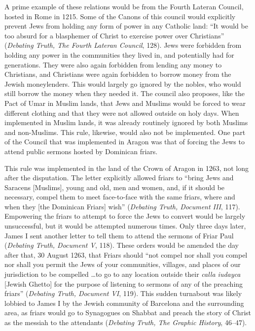 \documentclass[12pt]{article}
\begin{document}
A prime example of these relations would be from the Fourth Lateran Council, hosted in Rome in 1215.
Some of the Canons of this council would explicitly prevent Jews from holding any form of power in any Catholic land:
``It would be too absurd for a blasphemer of Christ to exercise power over Christians'' (\emph{Debating Truth, The Fourth Lateran Council}, 128).
Jews were forbidden from holding any power in the communities they lived in, and potentially had for generations.
They were also again forbidden from lending any money to Christians, and Christians were again forbidden to borrow money from the Jewish moneylenders.
This would largely go ignored by the nobles, who would still borrow the money when they needed it.
The council also proposes, like the Pact of Umar in Muslim lands, that Jews and Muslims would be forced to wear different clothing and that they were not allowed outside on holy days.
When implemented in Muslim lands, it was already routinely ignored by both Muslims and non-Muslims.
This rule, likewise, would also not be implemented.
One part of the Council that was implemented in Aragon was that of forcing the Jews to attend public sermons hosted by Dominican friars.

This rule was implemented in the land of the Crown of Aragon in 1263, not long after the disputation.
The letter explicitly allowed friars to
``bring Jews and Saracens [Muslims], young and old, men and women, and, if it should be necessary, compel them to meet face-to-face with the same friars, where and when they [the Dominican Friars]  wish'' (\emph{Debating Truth, Document III}, 117).
Empowering the friars to attempt to force the Jews to convert would be largely unsuccessful, but it would be attempted numerous times.
Only three days later, James I sent another letter to tell them to attend the sermons of Friar Paul (\emph{Debating Truth, Document V}, 118).
These orders would be amended the day after that, 30 August 1263, that Friars should ``not compel nor shall you compel nor shall you permit the Jews of your communities, villages, and places of our jurisdiction to be compelled \ldots to go to any location outside their \emph{calla iudayca} [Jewish Ghetto] for the purpose of listening to sermons of any of the preaching friars'' (\emph{Debating Truth, Document VI}, 119).
This sudden turnabout was likely lobbied to James I by the Jewish community of Barcelona and the surrounding area, as friars would go to Synagogues on Shabbat and preach the story of Christ as the messiah to the attendants (\emph{Debating Truth, The Graphic History}, 46--47).
\end{document}

